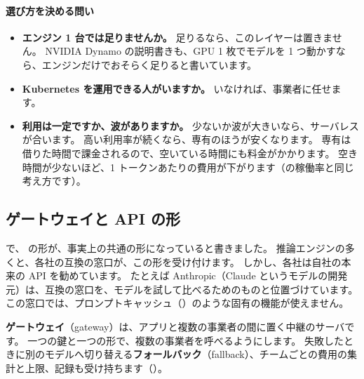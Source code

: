 \paragraph{選び方を決める問い}
\begin{itemize}[nosep,beginpenalty=10000]
\item \textbf{エンジン 1 台では足りませんか。}
  足りるなら、このレイヤーは置きません。
  NVIDIA Dynamo の説明書きも、GPU 1 枚でモデルを 1 つ動かすなら、エンジンだけでおそらく足りると書いています。
\item \textbf{Kubernetes を運用できる人がいますか。}
  いなければ、事業者に任せます。
\item \textbf{利用は一定ですか、波がありますか。}
  少ないか波が大きいなら、サーバレスが合います。
  高い利用率が続くなら、専有のほうが安くなります。
  専有は借りた時間で課金されるので、空いている時間にも料金がかかります。
  空き時間が少ないほど、1 トークンあたりの費用が下がります（の稼働率と同じ考え方です）。
\end{itemize}

\subsection{ゲートウェイと API の形}\label{sec:tm-gateway}

で、 の形が、事実上の共通の形になっていると書きました。
推論エンジンの多くと、各社の互換の窓口が、この形を受け付けます。
しかし、各社は自社の本来の API を勧めています。
たとえば Anthropic（Claude というモデルの開発元）は、互換の窓口を、モデルを試して比べるためのものと位置づけています。
この窓口では、プロンプトキャッシュ（）のような固有の機能が使えません。

\textbf{ゲートウェイ}（gateway）は、アプリと複数の事業者の間に置く中継のサーバです。
一つの鍵と一つの形で、複数の事業者を呼べるようにします。
失敗したときに別のモデルへ切り替える\textbf{フォールバック}（fallback）、チームごとの費用の集計と上限、記録も受け持ちます（）。

